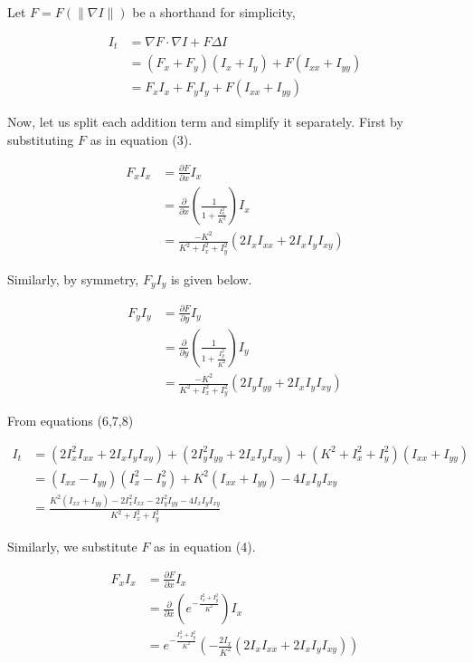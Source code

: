 \documentclass{article}
\begin{document}
Let $F = F(\|\nabla I\|)$ be a shorthand for simplicity,

\begin{align}
I_t &= \nabla F \cdot \nabla I + F \Delta I \\
    &= (F_x + F_y)(I_x + I_y) + F(I_{xx} + I_{yy}) \\
    &= F_{x}I_x + F_{y}I_y + F(I_{xx} + I_{yy}) \tag{6}
\end{align}

Now, let us split each addition term and simplify it separately. First by substituting $F$ as in equation (3).

\begin{align}
F_{x}I_x &= \frac{\partial F}{\partial x} I_x \\
         &= \frac{\partial}{\partial x} \left( \frac{1}{1 + \frac{I_x^2}{K^2}} \right) I_x \\
         &= \frac{-K^2}{K^2 + I_x^2 + I_y^2}(2I_xI_{xx} + 2I_xI_yI_{xy}) \tag{7}
\end{align}

Similarly, by symmetry, $F_{y}I_y$ is given below.

\begin{align}
F_{y}I_y &= \frac{\partial F}{\partial y} I_y \\
         &= \frac{\partial}{\partial y} \left( \frac{1}{1 + \frac{I_y^2}{K^2}} \right) I_y \\
         &= \frac{-K^2}{K^2 + I_x^2 + I_y^2}(2I_yI_{yy} + 2I_xI_yI_{xy}) \tag{8}
\end{align}

From equations (6,7,8)

\begin{align}
I_t &= (2I_x^2I_{xx} + 2I_xI_yI_{xy}) + (2I_y^2I_{yy} + 2I_xI_yI_{xy}) + (K^2 + I_x^2 + I_y^2)(I_{xx} + I_{yy}) \\
    &= (I_{xx} - I_{yy})(I_x^2 - I_y^2) + K^2(I_{xx} + I_{yy}) - 4I_xI_yI_{xy} \\
    &= \frac{K^2(I_{xx} + I_{yy}) - 2I_x^2I_{xx} - 2I_y^2I_{yy} - 4I_xI_yI_{xy}}{K^2 + I_x^2 + I_y^2} \tag{9}
\end{align}

Similarly, we substitute $F$ as in equation (4).

\begin{align}
F_{x}I_x &= \frac{\partial F}{\partial x} I_x \\
         &= \frac{\partial}{\partial x} \left( e^{-\frac{I_x^2 + I_y^2}{K^2}} \right) I_x \\
         &= e^{-\frac{I_x^2 + I_y^2}{K^2}} \left( -\frac{2I_x}{K^2}(2I_xI_{xx} + 2I_xI_yI_{xy}) \right) \tag{10}
\end{align}
\end{document}
